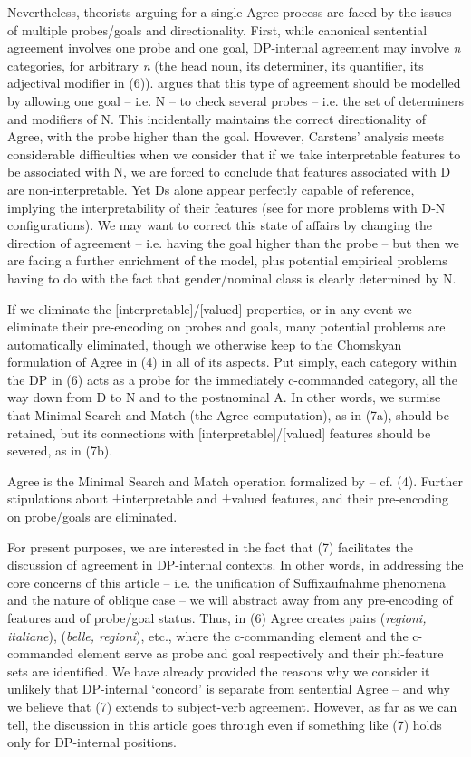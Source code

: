 \documentclass[output=paper]{langsci/langscibook}
\begin{document}
Nevertheless, theorists arguing for a single Agree process are faced by the issues of multiple probes\slash goals and directionality. First, while canonical sentential agreement involves one probe and one goal, DP-internal agreement may involve \textit{n} categories, for arbitrary \textit{n} (the head noun, its determiner, its quantifier, its adjectival modifier in (6)). \citet{Carstens2001} argues that this type of agreement should be modelled by allowing one goal – i.e. N – to check several probes – i.e. the set of determiners and modifiers of N. This incidentally maintains the correct directionality of Agree, with the probe higher than the goal. However, Carstens’ analysis meets considerable difficulties when we consider that if we take interpretable features to be associated with N, we are forced to conclude that features associated with D are non-interpretable. Yet Ds alone appear perfectly capable of reference, implying the interpretability of their features (see \citealt{Danon2010} for more problems with D-N configurations). We may want to correct this state of affairs by changing the direction of agreement – i.e. having the goal higher than the probe – but then we are facing a further enrichment of the model, plus potential empirical problems having to do with the fact that gender\slash nominal class is clearly determined by N.

If we eliminate the [interpretable]/[valued] properties, or in any event we eliminate their pre-encoding on probes and goals, many potential problems are automatically eliminated, though we otherwise keep to the Chomskyan formulation of Agree in (4) in all of its aspects. Put simply, each category within the DP in (6) acts as a probe for the immediately c-commanded category, all the way down from D to N and to the postnominal A. In other words, we surmise that Minimal Search and Match (the Agree computation), as in (7a), should be retained, but its connections with [interpretable]/[valued] features should be severed, as in (7b). 

\ea%
    \label{ex:manzini:7}
    \ea Agree is the Minimal Search and Match operation formalized by \citet{Chomsky2000} – cf. (4). 
    \ex Further stipulations about ±interpretable and ±valued features, and their pre-encoding on probe\slash goals \citep{Chomsky2001Derivation} are eliminated.  
    \z
\z


For present purposes, we are interested in the fact that (7) facilitates the discussion of agreement in DP-internal contexts. In other words, in addressing the core concerns of this article – i.e. the unification of Suffixaufnahme phenomena and the nature of oblique case – we will abstract away from any pre-encoding of features and of probe\slash goal status. Thus, in (6) Agree creates pairs (\textit{regioni, italiane}), (\textit{belle, regioni}), etc., where the c-commanding element and the c-commanded element serve as probe and goal respectively and their phi-feature sets are identified. We have already provided the reasons why we consider it unlikely that DP-internal ‘concord’ is separate from sentential Agree – and why we believe that (7) extends to subject-verb agreement. However, as far as we can tell, the discussion in this article goes through even if something like (7) holds only for DP-internal positions. 
\end{document}
